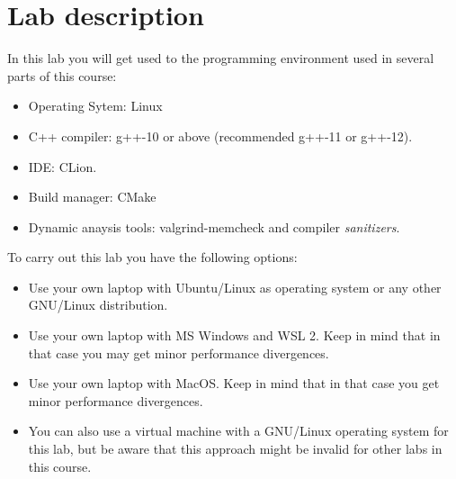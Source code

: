 \section{Lab description}

In this lab you will get used to the programming environment used in 
several parts of this course:

\begin{itemize}
  \item Operating Sytem: Linux
  \item C++ compiler: g++-10 or above (recommended g++-11 or g++-12).
  \item IDE: CLion.
  \item Build manager: CMake
  \item Dynamic anaysis tools: valgrind-memcheck and compiler \emph{sanitizers}.
\end{itemize}

To carry out this lab you have the following options:

\begin{itemize}
  \item Use your own laptop with Ubuntu/Linux as operating system
        or any other GNU/Linux distribution.

  \item Use your own laptop with MS Windows and WSL 2.
        Keep in mind that in that case you may get minor performance divergences.

  \item Use your own laptop with MacOS.
        Keep in mind that in that case you get minor performance divergences.

  \item You can also use a virtual machine with a GNU/Linux operating system
        for this lab, but be aware that this approach might be invalid for
        other labs in this course.
\end{itemize}
